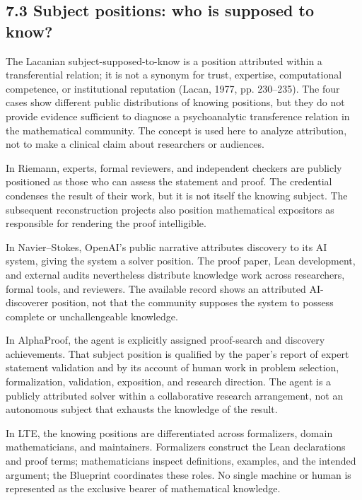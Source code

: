 \documentclass[sn-apa]{sn-jnl}
\begin{document}
\subsection{7.3 Subject positions: who is supposed to know?}

The Lacanian subject-supposed-to-know is a position attributed within a transferential relation; it is not a synonym for trust, expertise, computational competence, or institutional reputation (Lacan, 1977, pp. 230–235). The four cases show different public distributions of knowing positions, but they do not provide evidence sufficient to diagnose a psychoanalytic transference relation in the mathematical community. The concept is used here to analyze attribution, not to make a clinical claim about researchers or audiences.

In Riemann, experts, formal reviewers, and independent checkers are publicly positioned as those who can assess the statement and proof. The credential condenses the result of their work, but it is not itself the knowing subject. The subsequent reconstruction projects also position mathematical expositors as responsible for rendering the proof intelligible.

In Navier–Stokes, OpenAI’s public narrative attributes discovery to its AI system, giving the system a solver position. The proof paper, Lean development, and external audits nevertheless distribute knowledge work across researchers, formal tools, and reviewers. The available record shows an attributed AI-discoverer position, not that the community supposes the system to possess complete or unchallengeable knowledge.

In AlphaProof, the agent is explicitly assigned proof-search and discovery achievements. That subject position is qualified by the paper’s report of expert statement validation and by its account of human work in problem selection, formalization, validation, exposition, and research direction. The agent is a publicly attributed solver within a collaborative research arrangement, not an autonomous subject that exhausts the knowledge of the result.

In LTE, the knowing positions are differentiated across formalizers, domain mathematicians, and maintainers. Formalizers construct the Lean declarations and proof terms; mathematicians inspect definitions, examples, and the intended argument; the Blueprint coordinates these roles. No single machine or human is represented as the exclusive bearer of mathematical knowledge.
\end{document}

